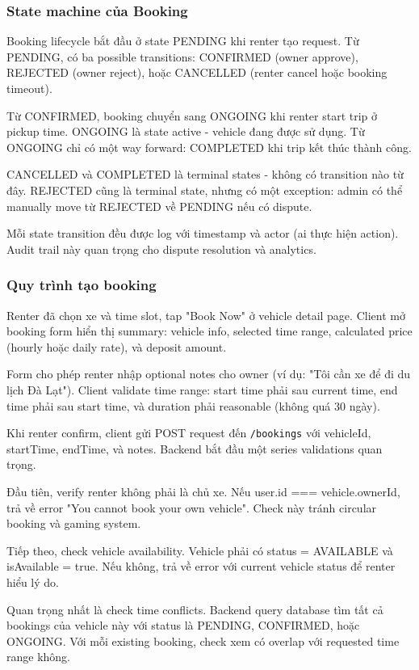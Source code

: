 \subsubsection{State machine của Booking}
Booking lifecycle bắt đầu ở state PENDING khi renter tạo request. Từ PENDING, có ba possible transitions: CONFIRMED (owner approve), REJECTED (owner reject), hoặc CANCELLED (renter cancel hoặc booking timeout).

Từ CONFIRMED, booking chuyển sang ONGOING khi renter start trip ở pickup time. ONGOING là state active - vehicle đang được sử dụng. Từ ONGOING chỉ có một way forward: COMPLETED khi trip kết thúc thành công.

CANCELLED và COMPLETED là terminal states - không có transition nào từ đây. REJECTED cũng là terminal state, nhưng có một exception: admin có thể manually move từ REJECTED về PENDING nếu có dispute.

Mỗi state transition đều được log với timestamp và actor (ai thực hiện action). Audit trail này quan trọng cho dispute resolution và analytics.

\subsubsection{Quy trình tạo booking}
Renter đã chọn xe và time slot, tap "Book Now" ở vehicle detail page. Client mở booking form hiển thị summary: vehicle info, selected time range, calculated price (hourly hoặc daily rate), và deposit amount.

Form cho phép renter nhập optional notes cho owner (ví dụ: "Tôi cần xe để đi du lịch Đà Lạt"). Client validate time range: start time phải sau current time, end time phải sau start time, và duration phải reasonable (không quá 30 ngày).

Khi renter confirm, client gửi POST request đến \texttt{/bookings} với vehicleId, startTime, endTime, và notes. Backend bắt đầu một series validations quan trọng.

Đầu tiên, verify renter không phải là chủ xe. Nếu user.id === vehicle.ownerId, trả về error "You cannot book your own vehicle". Check này tránh circular booking và gaming system.

Tiếp theo, check vehicle availability. Vehicle phải có status = AVAILABLE và isAvailable = true. Nếu không, trả về error với current vehicle status để renter hiểu lý do.

Quan trọng nhất là check time conflicts. Backend query database tìm tất cả bookings của vehicle này với status là PENDING, CONFIRMED, hoặc ONGOING. Với mỗi existing booking, check xem có overlap với requested time range không.

